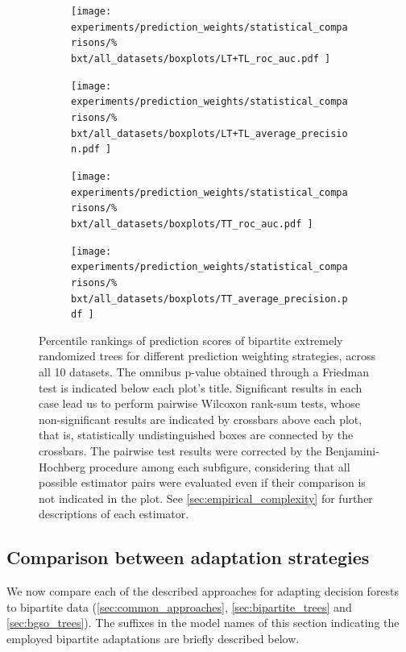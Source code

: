 \begin{figure}[tbh]
    \centering
    \begin{subfigure}{0.49\textwidth}
        \texttt{[image: 
            experiments/prediction\_weights/statistical\_comparisons/\%
            bxt/all\_datasets/boxplots/LT+TL\_roc\_auc.pdf
        ]}
    \end{subfigure}
    \begin{subfigure}{0.49\textwidth}
        \texttt{[image: 
            experiments/prediction\_weights/statistical\_comparisons/\%
            bxt/all\_datasets/boxplots/LT+TL\_average\_precision.pdf
        ]}
    \end{subfigure}

    \begin{subfigure}{0.49\textwidth}
        \texttt{[image: 
            experiments/prediction\_weights/statistical\_comparisons/\%
            bxt/all\_datasets/boxplots/TT\_roc\_auc.pdf
        ]}
    \end{subfigure}
    \begin{subfigure}{0.49\textwidth}
        \texttt{[image: 
            experiments/prediction\_weights/statistical\_comparisons/\%
            bxt/all\_datasets/boxplots/TT\_average\_precision.pdf
        ]}
    \end{subfigure}
    \caption{
        Percentile rankings of prediction scores of bipartite extremely randomized trees for different prediction weighting strategies, across all 10 datasets.
        The omnibus p-value obtained through a Friedman test is indicated below each plot's title. Significant results in each case lead us to perform pairwise Wilcoxon rank-sum tests, whose non-significant results are indicated by crossbars above each plot, that is, statistically undistinguished boxes are connected by the crossbars. The pairwise test results were corrected by the Benjamini-Hochberg procedure among each subfigure, considering that all possible estimator pairs were evaluated even if their comparison is not indicated in the plot. See \autoref{sec:empirical_complexity} for further descriptions of each estimator.
    }
    \label{fig:pred_weights_bxt}
\end{figure}


\subsection{Comparison between adaptation strategies}
\label{sec:adaptation_comparison}

We now compare each of the described approaches for adapting decision forests to bipartite data (\autoref{sec:common_approaches}, \autoref{sec:bipartite_trees} and \autoref{sec:bgso_trees}). The suffixes in the model names of this section indicating the employed bipartite adaptations are briefly described below.

